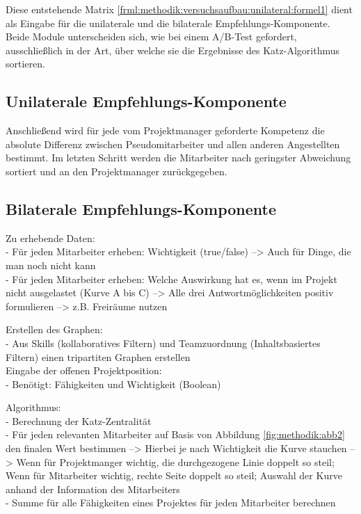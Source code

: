 Diese entstehende Matrix \ref{frml:methodik:versuchsaufbau:unilateral:formel1} dient als Eingabe für die unilaterale und die bilaterale Empfehlungs-Komponente. Beide Module unterscheiden sich, wie bei einem A/B-Test gefordert, ausschließlich in der Art, über welche sie die Ergebnisse des Katz-Algorithmus sortieren.

\subsection{Unilaterale Empfehlungs-Komponente}
\label{ch:methodik:versuchsaufbau:unilateral}
Anschließend wird für jede vom Projektmanager geforderte Kompetenz die absolute Differenz zwischen Pseudomitarbeiter und allen anderen Angestellten bestimmt. Im letzten Schritt werden die Mitarbeiter nach geringster Abweichung sortiert und an den Projektmanager zurückgegeben.

\subsection{Bilaterale Empfehlungs-Komponente}
\label{ch:methodik:versuchsaufbau:bilateral}

\newpage
Zu erhebende Daten:\\
- Für jeden Mitarbeiter erheben: Wichtigkeit (true/false) --> Auch für Dinge, die man noch nicht kann\\
- Für jeden Mitarbeiter erheben: Welche Auswirkung hat es, wenn im Projekt nicht ausgelastet (Kurve A bis C) --> Alle drei Antwortmöglichkeiten positiv formulieren --> z.B. Freiräume nutzen

Erstellen des Graphen:\\
- Aus Skills (kollaboratives Filtern) und Teamzuordnung (Inhaltsbasiertes Filtern) einen tripartiten Graphen erstellen\\

Eingabe der offenen Projektposition:\\
- Benötigt: Fähigkeiten und Wichtigkeit (Boolean)

Algorithmus:\\
- Berechnung der Katz-Zentralität\\
- Für jeden relevanten Mitarbeiter auf Basis von Abbildung \ref{fig:methodik:abb2} den finalen Wert bestimmen --> Hierbei je nach Wichtigkeit die Kurve stauchen --> Wenn für Projektmanger wichtig, die durchgezogene Linie doppelt so steil; Wenn für Mitarbeiter wichtig, rechte Seite doppelt so steil; Auswahl der Kurve anhand der Information des Mitarbeiters\\
- Summe für alle Fähigkeiten eines Projektes für jeden Mitarbeiter berechnen

